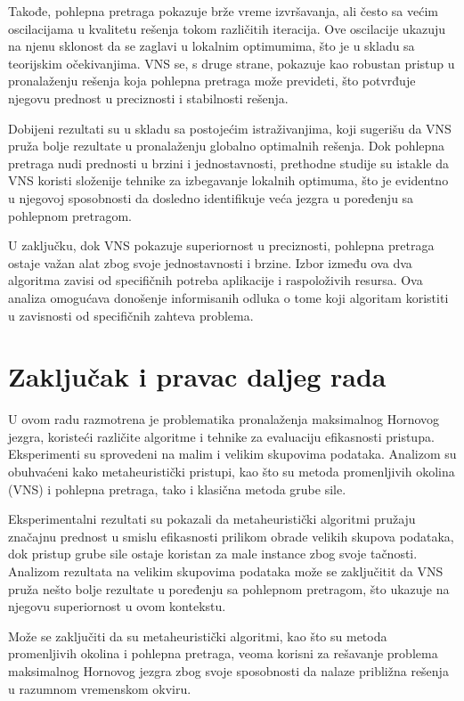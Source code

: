 \documentclass[12pt,oneside]{memoir}
\begin{document}
Takođe, pohlepna pretraga pokazuje brže vreme izvršavanja, ali često sa većim oscilacijama u kvalitetu rešenja tokom različitih iteracija. Ove oscilacije ukazuju na njenu sklonost da se zaglavi u lokalnim optimumima, što je u skladu sa teorijskim očekivanjima. VNS se, s druge strane, pokazuje kao robustan pristup u pronalaženju rešenja koja pohlepna pretraga može prevideti, što potvrđuje njegovu prednost u preciznosti i stabilnosti rešenja.

Dobijeni rezultati su u skladu sa postojećim istraživanjima, koji sugerišu da VNS pruža bolje rezultate u pronalaženju globalno optimalnih rešenja. Dok pohlepna pretraga nudi prednosti u brzini i jednostavnosti, prethodne studije su istakle da VNS koristi složenije tehnike za izbegavanje lokalnih optimuma, što je evidentno u njegovoj sposobnosti da dosledno identifikuje veća jezgra u poređenju sa pohlepnom pretragom.

U zaključku, dok VNS pokazuje superiornost u preciznosti, pohlepna pretraga ostaje važan alat zbog svoje jednostavnosti i brzine. Izbor između ova dva algoritma zavisi od specifičnih potreba aplikacije i raspoloživih resursa. Ova analiza omogućava donošenje informisanih odluka o tome koji algoritam koristiti u zavisnosti od specifičnih zahteva problema.

\chapter{Zaključak i pravac daljeg rada}

U ovom radu razmotrena je problematika pronalaženja maksimalnog Hornovog jezgra, koristeći različite algoritme i tehnike za evaluaciju efikasnosti pristupa. Eksperimenti su sprovedeni na malim i velikim skupovima podataka. Analizom su obuhvaćeni kako metaheuristički pristupi, kao što su metoda promenljivih okolina (VNS) i pohlepna pretraga, tako i klasična metoda grube sile. 

Eksperimentalni rezultati su pokazali da metaheuristički algoritmi pružaju značajnu prednost u smislu efikasnosti prilikom obrade velikih skupova podataka, dok pristup grube sile ostaje koristan za male instance zbog svoje tačnosti.
Analizom rezultata na velikim skupovima podataka može se zaključitit da VNS pruža nešto bolje rezultate u poređenju sa pohlepnom pretragom, što ukazuje na njegovu superiornost u ovom kontekstu.

Može se zaključiti da su metaheuristički algoritmi, kao što su metoda promenljivih okolina i pohlepna pretraga, veoma korisni za rešavanje problema maksimalnog Hornovog jezgra zbog svoje sposobnosti da nalaze približna rešenja u razumnom vremenskom okviru.
\end{document}
